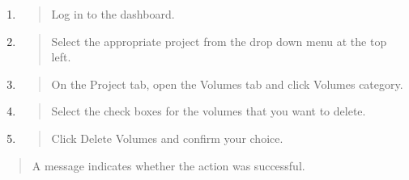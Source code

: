 \begin{enumerate}
\def\labelenumi{\arabic{enumi}.}
\item
  \begin{quote}
  Log in to the dashboard.
  \end{quote}
\item
  \begin{quote}
  Select the appropriate project from the drop down menu at the top
  left.
  \end{quote}
\item
  \begin{quote}
  On the Project tab, open the Volumes tab and click Volumes category.
  \end{quote}
\item
  \begin{quote}
  Select the check boxes for the volumes that you want to delete.
  \end{quote}
\item
  \begin{quote}
  Click Delete Volumes and confirm your choice.
  \end{quote}
\end{enumerate}

\begin{quote}
A message indicates whether the action was successful.
\end{quote}
